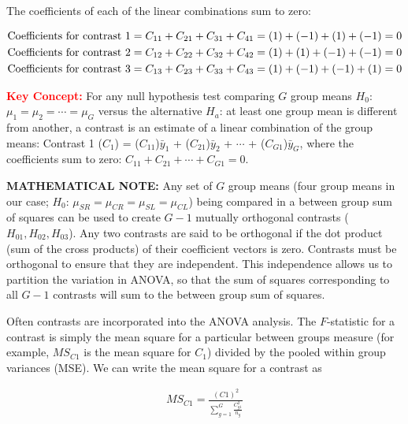 \documentclass[
]{report}
\begin{document}
The coefficients of each of the linear combinations sum to zero:

\begin{align}
\text{Coefficients for contrast 1} &= C_{11} + C_{21} + C_{31} + C_{41} = (1) + (-1) + (1) + (-1) = 0 \notag \\
\text{Coefficients for contrast 2} &= C_{12} + C_{22} + C_{32} + C_{42} = (1) + (1) + (-1) + (-1) = 0 \notag \\
\text{Coefficients for contrast 3} &= C_{13} + C_{23} + C_{33} + C_{43} = (1) + (-1) + (-1) + (1) = 0
\notag
\end{align}

\large

\textbf{\textcolor{red}{Key Concept:}}
\color{red}
For any null hypothesis test comparing \(G\) group means \(H_0\): \(\mu_1 = \mu_2 = \cdots = \mu_G\) versus the alternative \(H_a\): at least one group mean is different from another, a contrast is an estimate of a linear combination of the group means: Contrast 1 (\(C_1\)) = (\(C_{11}\))\(\bar{y}_1\) + (\(C_{21}\))\(\bar{y}_2\) + \(\cdots\) + (\(C_{G1}\))\(\bar{y}_G\), where the coefficients sum to zero: \(C_{11} + C_{21} + \cdots + C_{G1} = 0\).
\color{black}
\normalsize

\large

\textbf{MATHEMATICAL NOTE:}
Any set of \(G\) group means (four group means in our case; \(H_0\): \(\mu_{SR} = \mu_{CR} = \mu_{SL} = \mu_{CL}\)) being compared in a between group sum of squares can be used to create \(G-1\) mutually orthogonal contrasts (\(H_{01}, H_{02}, H_{03}\)). Any two contrasts are said to be orthogonal if the dot product (sum of the cross products) of their coefficient vectors is zero. Contrasts must be orthogonal to ensure that they are independent. This independence allows us to partition the variation in ANOVA, so that the sum of squares corresponding to all \(G-1\) contrasts will sum to the between group sum of squares.
\normalsize

Often contrasts are incorporated into the ANOVA analysis. The \(F\)-statistic for a contrast is simply the mean square for a particular between groups measure (for example, \(MS_{C1}\) is the mean square for \(C_1\)) divided by the pooled within group variances (MSE). We can write the mean square for a contrast as

\begin{align}\label{4.15}
MS_{C1} = \frac{(C1)^2}{\sum_{g=1}^{G} \frac{C_{g1}^2}{n_g}}
\tag{4.15}
\end{align}
\end{document}
